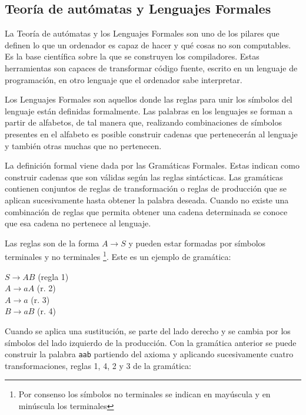 \subsection{Teoría de autómatas y Lenguajes Formales}

La Teoría de autómatas y los Lenguajes Formales son uno de los pilares que definen lo que un ordenador es capaz de hacer y qué cosas no son computables. Es la base científica sobre la que se construyen los compiladores. Estas herramientas son capaces de transformar código fuente, escrito en un lenguaje de programación, en otro lenguaje que el ordenador sabe interpretar.


Los Lenguajes Formales son aquellos donde las reglas para unir los símbolos del lenguaje están definidas formalmente. Las palabras en los lenguajes se forman a partir de alfabetos, de tal manera que, realizando combinaciones de símbolos presentes en el alfabeto es posible construir cadenas que pertenecerán al lenguaje y también otras muchas que no pertenecen. 


La definición formal viene dada por las Gramáticas Formales. Estas indican como construir cadenas que son válidas según las reglas sintácticas. Las gramáticas contienen conjuntos de reglas de transformación o reglas de producción que se aplican sucesivamente hasta obtener la palabra deseada. Cuando no existe una combinación de reglas que permita obtener una cadena determinada se conoce que esa cadena no pertenece al lenguaje.

Las reglas son de la forma $A\rightarrow S$ y pueden estar formadas por símbolos terminales y no terminales \footnote{Por consenso los símbolos no terminales se indican en mayúscula y en minúscula los terminales}. Este es un ejemplo de gramática:
\begin{center}
$S\rightarrow AB$ (regla 1) \\
$A\rightarrow aA$ (r. 2) \\
$A\rightarrow a$ (r. 3) \\
$B\rightarrow aB$ (r. 4) \\
\end{center}

Cuando se aplica una sustitución, se parte del lado derecho y se cambia por los símbolos del lado izquierdo de la producción. Con la gramática anterior se puede construir la palabra \verb|aab| partiendo del axioma y aplicando sucesivamente cuatro transformaciones, reglas 1, 4, 2 y 3 de la gramática:

